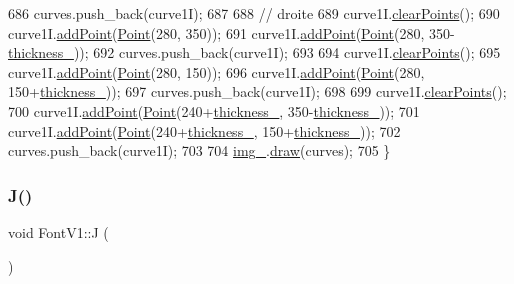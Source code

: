 \begin{DoxyCode}
686     curves.push\_back(curve1I);
687 
688     \textcolor{comment}{// droite}
689     curve1I.\mbox{\hyperlink{class_bezier_curve_a0ba8ce66d5af5971ae6a1b506029728e}{clearPoints}}();
690     curve1I.\mbox{\hyperlink{class_bezier_curve_a38d16c18b36ae45619b05e26e226cf34}{addPoint}}(\mbox{\hyperlink{class_point}{Point}}(280, 350));
691     curve1I.\mbox{\hyperlink{class_bezier_curve_a38d16c18b36ae45619b05e26e226cf34}{addPoint}}(\mbox{\hyperlink{class_point}{Point}}(280, 350-\mbox{\hyperlink{class_font_v1_aed8040e76be9a52833627b92f0fb4e5f}{thickness\_}}));
692     curves.push\_back(curve1I);
693 
694     curve1I.\mbox{\hyperlink{class_bezier_curve_a0ba8ce66d5af5971ae6a1b506029728e}{clearPoints}}();
695     curve1I.\mbox{\hyperlink{class_bezier_curve_a38d16c18b36ae45619b05e26e226cf34}{addPoint}}(\mbox{\hyperlink{class_point}{Point}}(280, 150));
696     curve1I.\mbox{\hyperlink{class_bezier_curve_a38d16c18b36ae45619b05e26e226cf34}{addPoint}}(\mbox{\hyperlink{class_point}{Point}}(280, 150+\mbox{\hyperlink{class_font_v1_aed8040e76be9a52833627b92f0fb4e5f}{thickness\_}}));
697     curves.push\_back(curve1I);
698 
699     curve1I.\mbox{\hyperlink{class_bezier_curve_a0ba8ce66d5af5971ae6a1b506029728e}{clearPoints}}();
700     curve1I.\mbox{\hyperlink{class_bezier_curve_a38d16c18b36ae45619b05e26e226cf34}{addPoint}}(\mbox{\hyperlink{class_point}{Point}}(240+\mbox{\hyperlink{class_font_v1_aed8040e76be9a52833627b92f0fb4e5f}{thickness\_}}, 350-\mbox{\hyperlink{class_font_v1_aed8040e76be9a52833627b92f0fb4e5f}{thickness\_}}));
701     curve1I.\mbox{\hyperlink{class_bezier_curve_a38d16c18b36ae45619b05e26e226cf34}{addPoint}}(\mbox{\hyperlink{class_point}{Point}}(240+\mbox{\hyperlink{class_font_v1_aed8040e76be9a52833627b92f0fb4e5f}{thickness\_}}, 150+\mbox{\hyperlink{class_font_v1_aed8040e76be9a52833627b92f0fb4e5f}{thickness\_}}));
702     curves.push\_back(curve1I);
703 
704     \mbox{\hyperlink{class_font_v1_a00569e3e3c4b70f437b63f396f735fb0}{img\_}}.\mbox{\hyperlink{class_image_a8d162f3cab956131d58708c09aa560b0}{draw}}(curves);
705 \}
\end{DoxyCode}
\mbox{\label{class_font_v1_a3fe315f13fd21c6dbd5f81113cd1c3f6}} 
\subsubsection{\texorpdfstring{J()}{J()}}
{\footnotesize\ttfamily void Font\+V1\+::J (\begin{DoxyParamCaption}{ }\end{DoxyParamCaption})}



